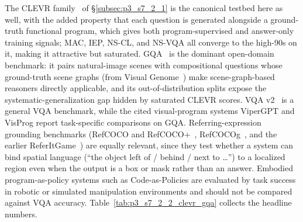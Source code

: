 The CLEVR family~\cite{johnson2017clevr} of §\ref{subsec:p3_s7_2_1} is the canonical testbed here as well, with the added property that each question is generated alongside a ground-truth functional program, which gives both program-supervised and answer-only training signals; MAC, IEP, NS-CL, and NS-VQA all converge to the high-90s on it, making it attractive but saturated.
GQA~\cite{hudson2019gqa} is the dominant open-domain benchmark: it pairs natural-image scenes with compositional questions whose ground-truth scene graphs (from Visual Genome~\cite{krishna2017visual}) make scene-graph-based reasoners directly applicable, and its out-of-distribution splits expose the systematic-generalization gap hidden by saturated CLEVR scores.
VQA v2~\cite{goyal2017making} is a general VQA benchmark, while the cited visual-program systems ViperGPT and VisProg report task-specific comparisons on GQA.
Referring-expression grounding benchmarks (RefCOCO and RefCOCO+~\cite{yu2016modeling}, RefCOCOg~\cite{mao2016generation}, and the earlier ReferItGame~\cite{kazemzadeh2014referitgame}) are equally relevant, since they test whether a system can bind spatial language (``the object left of / behind / next to \dots'') to a localized region even when the output is a box or mask rather than an answer.
Embodied program-as-policy systems such as Code-as-Policies are evaluated by task success in robotic or simulated manipulation environments and should not be compared against VQA accuracy.
Table~\ref{tab:p3_s7_2_2_clevr_gqa} collects the headline numbers.

